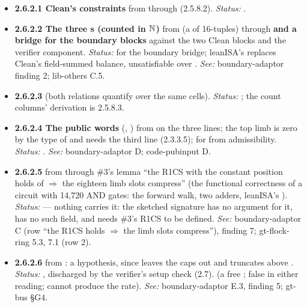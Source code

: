 \begin{itemize}[label={}, leftmargin=1.3em, itemindent=-1.3em, labelwidth=0pt, labelsep=0pt, itemsep=4pt, topsep=3pt]
\begin{itemize}[label={}, leftmargin=1.3em, itemindent=-1.3em, labelwidth=0pt, labelsep=0pt, itemsep=4pt, topsep=3pt]
\item {}\label{obl:node-2.6.2.1}\textbf{2.6.2.1 Clean's constraints} from  through  (2.5.8.2). \emph{Status:} .
\item {}\label{obl:node-2.6.2.2}\oblflag\textbf{2.6.2.2 The three s (counted in \ensuremath{\N})} from  (a  of 16-tuples) through  \textbf{and a bridge for the boundary blocks} against the two Clean blocks and the verifier component. \emph{Status:}   for the boundary bridge; leanISA's  replaces Clean's field-summed balance, unsatisfiable over . \emph{See:} boundary-adaptor finding 2; lib-others C.5.
\item {}\label{obl:node-2.6.2.3}\textbf{2.6.2.3 } (both relations quantify over the same cells). \emph{Status:} ; the count columns' derivation is 2.5.8.3.
\item {}\label{obl:node-2.6.2.4}\textbf{2.6.2.4 The public words} (, ) from  on the three lines; the top limb is zero by the type of  and needs the third line (2.3.3.5);  for  from admissibility. \emph{Status:} . \emph{See:} boundary-adaptor D; code-pubinput D.
\item {}\label{obl:node-2.6.2.5}\oblflag\textbf{2.6.2.5 } from  through \#3's lemma ``the R1CS with the constant position holds of  \ensuremath{\Rightarrow} the eighteen limb slots compress'' (the functional correctness of a circuit with 14,720 AND gates: the forward walk, two adders, leanISA's ). \emph{Status:}   — nothing carries it: the sketched signature has no argument for it,  has no such field, and  needs \#3's R1CS to be defined. \emph{See:} boundary-adaptor C (row ``the R1CS holds \ensuremath{\Rightarrow} the limb slots compress''), finding 7; gt-flock-ring 5.3, 7.1 (row 2).
\item {}\label{obl:node-2.6.2.6}\textbf{2.6.2.6 } from : a hypothesis, since  leaves the caps out and  truncates above . \emph{Status:} , discharged by the verifier's setup check (2.7).   (a free ; false in either reading;  cannot produce the rate). \emph{See:} boundary-adaptor E.3, finding 5; gt-bus §G4.

\end{itemize}
\end{itemize}
